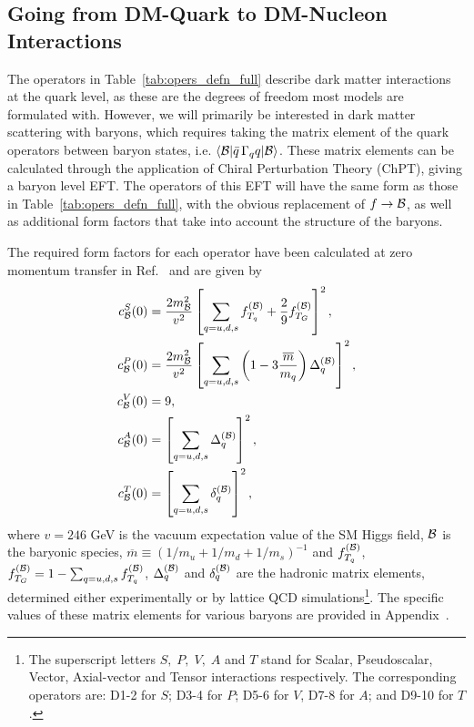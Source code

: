 \subsection{Going from DM-Quark to DM-Nucleon Interactions}

The operators in Table~\ref{tab:opers_defn_full} describe dark matter interactions at the quark level, as these are the degrees of freedom most models are formulated with. However, we will primarily be interested in dark matter scattering with baryons, which requires taking the matrix element of the quark operators between baryon states, i.e. $\langle {\cal B} | \bar q \, \Gamma_q q| {\cal B}\rangle$. These matrix elements can be calculated through the application of Chiral Perturbation Theory (ChPT), giving a baryon level EFT. The operators of this EFT will have the same form as those in Table~\ref{tab:opers_defn_full}, with the obvious replacement of $f\rightarrow \cal B$, as well as additional form factors that take into account the structure of the baryons.

The required form factors for each operator have been calculated at zero momentum transfer in Ref.~\cite{Cirelli:2013ufw_oct_Toolsmodelindependentbounds} and are given by 
\begin{align}
c_{\cal B}^S(0) &= \frac{2 m_{\cal B}^2}{v^2}\left[\sum_{q=u,d,s}f_{T_q}^{(\cal B)}+\frac{2}{9}f_{T_G}^{(\cal B)}\right]^2,\\
c_{\cal B}^P(0) &= \frac{2 m_{\cal B}^2}{v^2}\left[\sum_{q=u,d,s}\left(1-3\frac{\overline{m}}{m_q}\right)\Delta_q^{(\cal B)}\right]^2,\\
c_{\cal B}^V(0) &= 9,\\
c_{\cal B}^A(0) &=  \left[\sum_{q=u,d,s}\Delta_q^{(\cal B)}\right]^2,\\
c_{\cal B}^T(0) &= \left[\sum_{q=u,d,s}\delta_q^{(\cal B)}\right]^2,
\end{align}
where  $v=246$ GeV is the vacuum expectation value of the SM Higgs field, $\cal B$ is the baryonic species,  $\overline{m}\equiv(1/m_u+1/m_d+1/m_s)^{-1}$ and $f_{T_q}^{(\cal B)}$, $f_{T_G}^{(\cal B)}=1-\sum_{q=u,d,s} f_{T_q}^{(\cal B)}$, $\Delta_q^{(\cal B)}$ and $\delta_q^{(\cal B)}$ are the hadronic matrix elements, determined either experimentally or by lattice QCD simulations\footnote{The superscript letters $S,\;P,\;V,\;A$ and $T$ stand for Scalar, Pseudoscalar, Vector, Axial-vector and Tensor interactions respectively. The corresponding operators are: D1-2 for $S$; D3-4 for $P$; D5-6 for $V$, D7-8 for $A$; and D9-10 for $T$.}. The specific values of these matrix elements for various baryons are provided in Appendix~.

